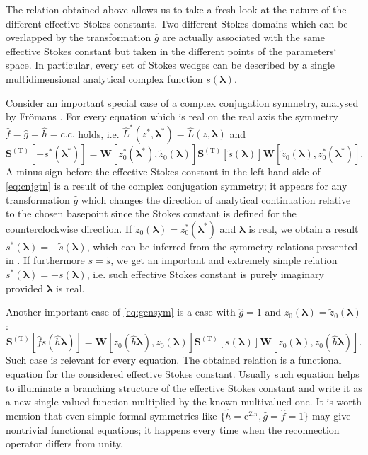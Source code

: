 \documentclass[atmp]{ipart_v1}
\def\LL{\widehat{L}}
\def\rme{\mathrm{e}}
\def\rmi{\mathrm{i}}
\def\lmbd{\bm{\lambda}}
\def\f{\hat{f}}
\def\g{\hat{g}}
\def\h{\hat{h}}
\def\S{\bm{S}}
\def\W{\bm{W}}
\def\T{\mathrm{T}}
\def\unity{1}
\newcommand\eref[1]{\eqref{#1}}
\begin{document}
The relation obtained above allows us to take a fresh look at the nature of the 
different effective Stokes constants. Two different Stokes domains which can be overlapped by the 
transformation $\g$ are actually associated with the same effective Stokes constant but 
taken in the different points of the parameters` space. In particular, every set of Stokes 
wedges can be described by a single multidimensional analytical complex function $s(\lmbd)$.

Consider an important special case of a complex conjugation symmetry, 
analysed by Fr\"omans \cite{frsymm}. 
For every equation which is real on the real axis the symmetry $\f=\g=\h=c.c.$ holds, 
i.e. $\LL^*(z^*,\lmbd^*)=\LL(z,\lmbd)$ and
\begin{equation}
\S^{(\T)} \left[ - s^*(\lmbd^*) \right] = 
\W \left[ z_0^*(\lmbd^*), \tilde{z}_0(\lmbd) \right]
\S^{(\T)} \left[ \tilde{s}(\lmbd) \right]
\W \left[ \tilde{z}_0(\lmbd), z_0^*(\lmbd^*) \right].
\label{eq:cnjgtn}
\end{equation}
A minus sign before the effective Stokes constant in the left hand side of \eref{eq:cnjgtn} is a result 
of the complex conjugation symmetry; it appears for any transformation $\g$ which changes the direction
of analytical continuation relative to the chosen basepoint since the Stokes constant is defined for the 
counterclockwise direction.
If $\tilde{z}_0(\lmbd) = z_0^*(\lmbd^*)$ and $\lmbd$ is real, we obtain a result 
$s^*(\lmbd) = - \tilde{s}(\lmbd)$, which can be inferred from the symmetry relations presented in \cite{frsymm}. 
If furthermore $s = \tilde{s}$, we get an important and extremely simple relation $ s^*(\lmbd) = - s(\lmbd)$, 
i.e. such effective Stokes constant is purely imaginary provided $\lmbd$ is real.

Another important case of \eref{eq:gensym} is a case with $\g=\unity$ and $z_0(\lmbd) = \tilde{z}_0(\lmbd)$:
\begin{equation}
\S^{(\T)} \left[ \f s(\h\lmbd) \right] = 
\W \left[ z_0(\h\lmbd), z_0(\lmbd) \right]
\S^{(\T)} \left[ s(\lmbd) \right]
\W \left[ z_0(\lmbd), z_0(\h\lmbd) \right].
\label{eq:func}
\end{equation}
Such case is relevant for every equation. The obtained relation is a functional 
equation for the considered effective Stokes constant. Usually such equation helps to illuminate 
a branching structure of the effective Stokes constant and write it as a new single-valued function 
multiplied by the known multivalued one. It is worth mention that even simple formal 
symmetries like $\{\h=\rme^{2\rmi\pi},\g=\f=\unity\}$ may give nontrivial functional equations; 
it happens every time when the reconnection operator differs from unity.
\end{document}

